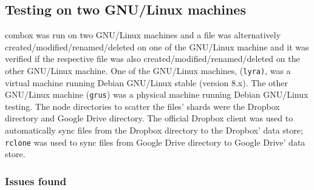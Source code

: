 \subsection{Testing on two GNU/Linux machines}

combox was run on two GNU/Linux machines and a file was alternatively
created/modified/renamed/deleted on one of the GNU/Linux machine and
it was verified if the respective file was also
created/modified/renamed/deleted on the other GNU/Linux machine. One
of the GNU/Linux machines, (\verb+lyra)+, was a virtual machine
running Debian GNU/Linux stable (version 8.x). The other GNU/Linux
machine (\verb+grus+) was a physical machine running Debian GNU/Linux
testing. The node directories to scatter the files' shards were the
Dropbox directory and Google Drive directory. The official Dropbox
client was used to automatically sync files from the Dropbox directory
to the Dropbox' data store; \verb+rclone+\cite{program:rclone} was
used to sync files from Google Drive directory to Google Drive' data
store.

\subsubsection{Issues found}\label{ch-4-2gnus-issues}

